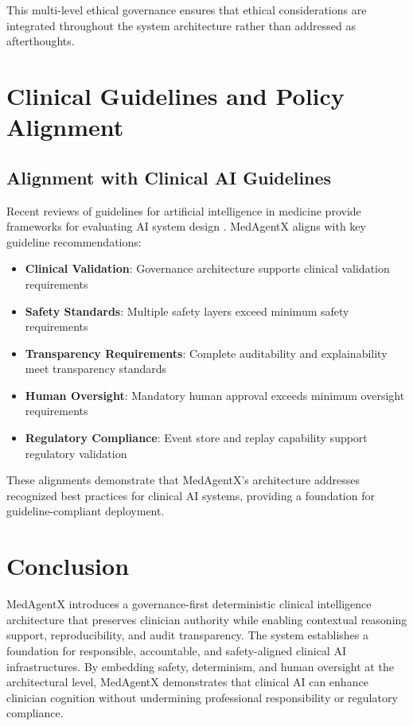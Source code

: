 \documentclass[conference]{IEEEtran}
\begin{document}
This multi-level ethical governance ensures that ethical considerations are integrated throughout the system architecture rather than addressed as afterthoughts.

\section{Clinical Guidelines and Policy Alignment}

\subsection{Alignment with Clinical AI Guidelines}
Recent reviews of guidelines for artificial intelligence in medicine provide frameworks for evaluating AI system design \cite{guidelines_ai_medicine_2023}. MedAgentX aligns with key guideline recommendations:

\begin{itemize}
    \item \textbf{Clinical Validation}: Governance architecture supports clinical validation requirements
    \item \textbf{Safety Standards}: Multiple safety layers exceed minimum safety requirements
    \item \textbf{Transparency Requirements}: Complete auditability and explainability meet transparency standards
    \item \textbf{Human Oversight}: Mandatory human approval exceeds minimum oversight requirements
    \item \textbf{Regulatory Compliance}: Event store and replay capability support regulatory validation
\end{itemize}

These alignments demonstrate that MedAgentX's architecture addresses recognized best practices for clinical AI systems, providing a foundation for guideline-compliant deployment.

\section{Conclusion}
MedAgentX introduces a governance-first deterministic clinical intelligence architecture that preserves clinician authority while enabling contextual reasoning support, reproducibility, and audit transparency. The system establishes a foundation for responsible, accountable, and safety-aligned clinical AI infrastructures. By embedding safety, determinism, and human oversight at the architectural level, MedAgentX demonstrates that clinical AI can enhance clinician cognition without undermining professional responsibility or regulatory compliance.
\end{document}
